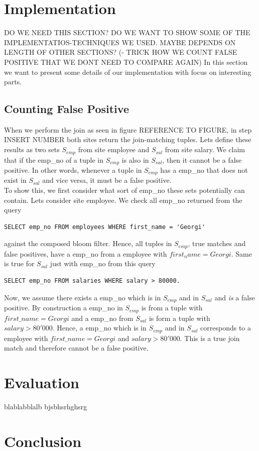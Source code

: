 \documentclass[12]{scrartcl}
\begin{document}
\section{Implementation}
DO WE NEED THIS SECTION? DO WE WANT TO SHOW SOME OF THE IMPLEMENTATIOS-TECHNIQUES WE USED. MAYBE DEPENDS ON LENGTH OF OTHER SECTIONS? (- TRICK HOW WE COUNT FALSE POSITIVE THAT WE DONT NEED TO COMPARE AGAIN)
In this section we want to present some details of our implementation with focus on interesting parts.

\subsection{Counting False Positive}
When we perform the join as seen in figure REFERENCE TO FIGURE, in step INSERT NUMBER both sites return the join-matching tuples. Lets define these results as two sets $S_{emp}$ from site employee and $S_{sal}$ from site salary. We claim that if the emp\_no of a tuple in $S_{emp}$ is also in $S_{sal}$, then it cannot be a false positive. In other words, whenever a tuple in $S_{emp}$ has a emp\_no that does not exist in $S_{sal}$ and vice versa, it must be a false positive. \\
To show this, we first consider what sort of emp\_no these sets potentially can contain. Lets consider site employee. We check all emp\_no returned from the query
\begin{verbatim}
SELECT emp_no FROM employees WHERE first_name = 'Georgi'
\end{verbatim}
against the composed bloom filter. Hence, all tuples in $S_{emp}$, true matches and false positives, have a emp\_no from a employee with $first_name = Georgi$. Same is true for $S_{sal}$ just with emp\_no from this query 
\begin{verbatim}
SELECT emp_no FROM salaries WHERE salary > 80000.
\end{verbatim}
Now, we assume there exists a emp\_no which is in $S_{emp}$ and in $S_{sal}$ and \emph{is} a false positive. By construction a emp\_no in $S_{emp}$ is from a tuple with $first\_name = Georgi$ and a emp\_no from $S_{sal}$ is form a tuple with $salary > 80'000$. Hence, a emp\_no which is in $S_{emp}$ and in $S_{sal}$ corresponds to a employee with $first\_name = Georgi$ and $salary > 80'000$. This is a true join match and therefore cannot be a false positive.


\section{Evaluation}

blablabblalb bjsbhsrhghsrg

\section{Conclusion}



\end{document}
